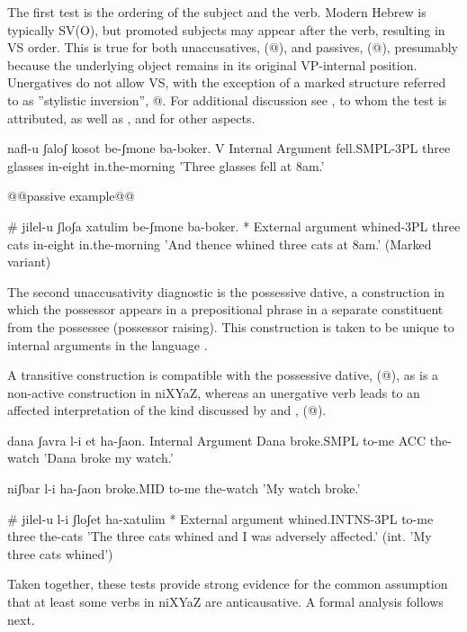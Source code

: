 The first test is the ordering of the subject and the verb. Modern Hebrew is typically SV(O), but promoted subjects may appear after the verb, resulting in VS order. This is true for both unaccusatives, (@), and passives, (@), presumably because the underlying object remains in its original VP-internal position. Unergatives do not allow VS, with the exception of a marked structure referred to as ''stylistic inversion'', @. For additional discussion see \cite{shlonsky87}, to whom the test is attributed, as well as \cite{shlonskydoron91}, \cite{borer95} and \cite{preminger10} for other aspects.

nafl-u ʃaloʃ kosot be-ʃmone ba-boker.         V Internal Argument
     fell.SMPL-3PL three glasses in-eight in.the-morning
     'Three glasses fell at 8am.'
    
    @@passive example@@

     \# jilel-u ʃloʃa xatulim be-ʃmone ba-boker.    * External argument
         whined-3PL three cats in-eight in.the-morning
        'And thence whined three cats at 8am.' (Marked variant)
   
The second unaccusativity diagnostic is the possessive dative, a construction in which the possessor appears in a prepositional phrase in a separate constituent from the possessee (possessor raising). This construction is taken to be unique to internal arguments in the language \citep{borergrodzinsky86}.

A transitive construction is compatible with the possessive dative, (@), as is a non-active construction in niXYaZ, whereas an unergative verb leads to an affected interpretation of the kind discussed by \cite{arieletal15} and \cite{barashersiegalboneh16}, (@). 

dana ʃavra l-i et ha-ʃaon.        Internal Argument
 Dana broke.SMPL to-me ACC the-watch
 'Dana broke my watch.'

      niʃbar l-i ha-ʃaon
         broke.MID to-me the-watch
         'My watch broke.'
                 
        \# jilel-u l-i ʃloʃet ha-xatulim        * External argument
         whined.INTNS-3PL to-me three the-cats
         'The three cats whined and I was adversely affected.' (int. 'My three cats whined')
   
Taken together, these tests provide strong evidence for the common assumption that at least some verbs in niXYaZ are anticausative. A formal analysis follows next.

	
